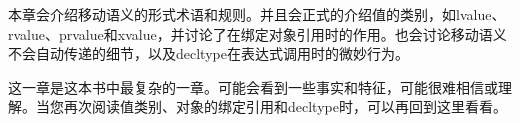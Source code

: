 本章会介绍移动语义的形式术语和规则。并且会正式的介绍值的类别，如lvalue、rvalue、prvalue和xvalue，并讨论了在绑定对象引用时的作用。也会讨论移动语义不会自动传递的细节，以及decltype在表达式调用时的微妙行为。

这一章是这本书中最复杂的一章。可能会看到一些事实和特征，可能很难相信或理解。当您再次阅读值类别、对象的绑定引用和decltype时，可以再回到这里看看。